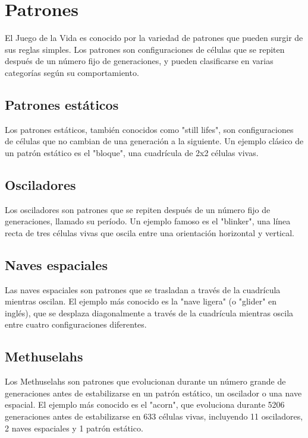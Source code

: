 \documentclass[]{article}
\begin{document}
\section{Patrones}
El Juego de la Vida es conocido por la variedad de patrones que pueden surgir de sus reglas simples. Los patrones son configuraciones de células que se repiten después de un número fijo de generaciones, y pueden clasificarse en varias categorías según su comportamiento.

\subsection{Patrones estáticos}
Los patrones estáticos, también conocidos como "still lifes", son configuraciones de células que no cambian de una generación a la siguiente. Un ejemplo clásico de un patrón estático es el "bloque", una cuadrícula de 2x2 células vivas.


\subsection{Osciladores}
Los osciladores son patrones que se repiten después de un número fijo de generaciones, llamado su período. Un ejemplo famoso es el "blinker", una línea recta de tres células vivas que oscila entre una orientación horizontal y vertical.


\subsection{Naves espaciales}
Las naves espaciales son patrones que se trasladan a través de la cuadrícula mientras oscilan. El ejemplo más conocido es la "nave ligera" (o "glider" en inglés), que se desplaza diagonalmente a través de la cuadrícula mientras oscila entre cuatro configuraciones diferentes.

\subsection{Methuselahs}
Los Methuselahs son patrones que evolucionan durante un número grande de generaciones antes de estabilizarse en un patrón estático, un oscilador o una nave espacial. El ejemplo más conocido es el "acorn", que evoluciona durante 5206 generaciones antes de estabilizarse en 633 células vivas, incluyendo 11 osciladores, 2 naves espaciales y 1 patrón estático.
\end{document}
